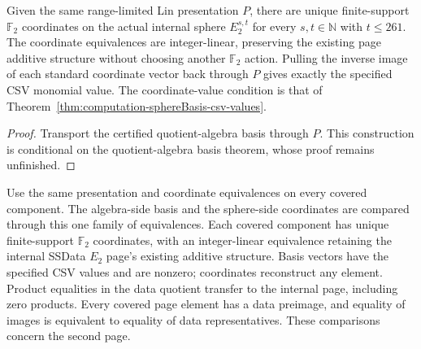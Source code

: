 \begin{theorem}
  \label{thm:lin-sphere-basis-interface}
  \notready
  Given the same range-limited Lin presentation $P$, there are unique
  finite-support $\mathbb F_2$ coordinates on the actual internal sphere
  $E_2^{s,t}$ for every $s,t\in\mathbb N$ with $t\le261$.
  The coordinate equivalences are integer-linear, preserving the existing
  page additive structure without choosing another $\mathbb F_2$ action.
  Pulling the inverse image of each standard coordinate vector back
  through $P$ gives exactly the specified CSV monomial value.
  The coordinate-value condition is that of
  Theorem~\ref{thm:computation-sphereBasis-csv-values}.
\end{theorem}
\begin{proof}
  Transport the certified quotient-algebra basis through $P$.
  This construction is conditional on the quotient-algebra basis theorem,
  whose proof remains unfinished.
\end{proof}

\begin{definition}
  \label{def:lin-e2-coordinates}
  \notready
  Use the same presentation and coordinate equivalences on every covered
  component. The algebra-side basis and the sphere-side coordinates are
  compared through this one family of equivalences.
  Each covered component has unique finite-support $\mathbb F_2$
  coordinates, with an integer-linear equivalence retaining the internal
  SSData $E_2$ page's existing additive structure.
  Basis vectors have the specified CSV values and are nonzero; coordinates
  reconstruct any element. Product equalities in the data quotient transfer
  to the internal page, including zero products. Every covered page element
  has a data preimage, and equality of images is equivalent to equality of
  data representatives. These comparisons concern the second page.
\end{definition}

